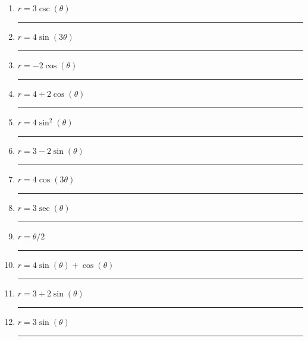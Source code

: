 \documentclass[11pt]{exam}
\begin{document}
\newcommand\aline[1]{\rule{0.5in}{0.2pt} }

\vspace{2ex}
\begin{multicols}{3}
	\begin{enumerate}
		\item $r = 3\csc(\theta)$ \aline{L}
		\item $r=4\sin(3\theta)$ \aline{F}
		\item $r = -2 \cos(\theta)$ \aline{B}
		\item $r=4+2\cos(\theta)$ \aline{E}
		\item $r=4\sin^2(\theta)$ \aline{I}
		\item $r = 3-2\sin(\theta)$ \aline{D}
		\item $r=4\cos(3\theta)$ \aline{G}
		\item $r = 3\sec(\theta)$ \aline{J}
		\item $r = \theta/2$ \aline{K}
		\item $r=4\sin(\theta)+\cos(\theta)$ \aline{H}
		\item $r = 3+2\sin(\theta)$ \aline{C}
		\item $r = 3\sin(\theta)$ \aline{A}
	\end{enumerate}
	\end{multicols}
\clearpage
\end{document}
